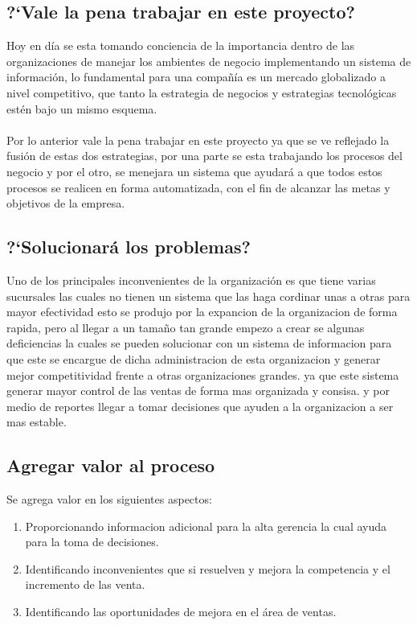 \subsection{?`Vale la pena trabajar en este proyecto?}
Hoy en d\'ia se esta tomando conciencia de la importancia dentro de las organizaciones de manejar los ambientes de negocio implementando un sistema de informaci\'on, lo fundamental para una compa\~n\'ia es un mercado globalizado a nivel competitivo, que tanto la estrategia de negocios y estrategias tecnol\'ogicas est\'en bajo un mismo esquema.%
\\%
\\%
Por lo anterior vale la pena trabajar en este proyecto ya que se ve reflejado la fusi\'on de estas dos estrategias, por una parte se esta trabajando los procesos del negocio y por el otro, se menejara un sistema que ayudar\'a a que todos estos procesos se realicen en forma automatizada, con el fin de alcanzar las metas y objetivos de la empresa.%
%
\subsection{?`Solucionar\'a los problemas?}
Uno de los principales inconvenientes de la organizaci\'on es que tiene varias sucursales las cuales no tienen un sistema que las haga cordinar unas a otras para mayor efectividad esto se produjo por la expancion de la organizacion de forma rapida, pero al llegar a un tama\~no tan grande empezo a crear se algunas deficiencias la cuales se pueden solucionar con un sistema de informacion para que este se encargue de dicha administracion de esta organizacion y generar mejor competitividad frente a otras organizaciones grandes. ya que este sistema generar mayor control de las ventas de forma mas organizada y consisa. y por medio de reportes llegar a tomar decisiones que ayuden a la organizacion a ser mas estable.%
%
\subsection{Agregar valor al proceso}
Se agrega valor en los siguientes aspectos:%
\begin{enumerate}
	\item Proporcionando informacion adicional para la alta gerencia la cual ayuda para la toma de decisiones.
	\item Identificando inconvenientes que si resuelven y mejora la competencia y el incremento de las venta.
	\item Identificando las oportunidades de mejora en el \'area de ventas.
\end{enumerate}%
%
